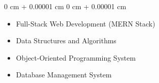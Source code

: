 \documentclass[11pt, a4paper]{article}
\newenvironment{highlights}{
    \begin{itemize}[
        topsep=0.10 cm,
        parsep=0.10 cm,
        partopsep=0pt,
        itemsep=0pt,
        leftmargin=0 cm + 10pt
    ]
}{
    \end{itemize}
} %
\newenvironment{onecolentry}{
    \begin{adjustwidth}{
        0 cm + 0.00001 cm
    }{
        0 cm + 0.00001 cm
    }
}{
    \end{adjustwidth}
} %
\newenvironment{twocolentry}[2][]{
    \onecolentry
    \def\secondColumn{#2}
    \setcolumnwidth{\fill, 4.5 cm}
    \begin{paracol}{2}
}{
    \switchcolumn \raggedleft \secondColumn
    \end{paracol}
    \endonecolentry
} %
\begin{document}
        \begin{onecolentry}
            \begin{highlights}
                \item Full-Stack Web Development (MERN Stack)
                \item Data Structures and Algorithms
                \item Object-Oriented Programming System
                \item Database Management System
            \end{highlights}
        \end{onecolentry}




    
\end{document}

